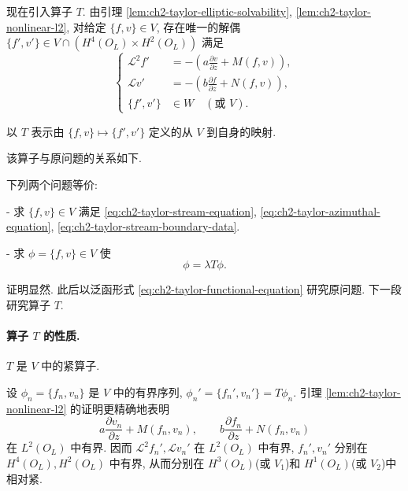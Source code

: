 现在引入算子 $T$. 由引理 \ref{lem:ch2-taylor-elliptic-solvability}, \ref{lem:ch2-taylor-nonlinear-l2}, 对给定 $\{f,v\}\in V$, 存在唯一的解偶 $\{f',v'\}\in V\cap(H^4(O_L)\times H^2(O_L))$ 满足
\begin{equation}
\left\{
\begin{aligned}
\mathcal L^2f'&=-\left(a\frac{\partial v}{\partial z}+M(f,v)\right),\\
\mathcal Lv'&=-\left(b\frac{\partial f}{\partial z}+N(f,v)\right),\\
\{f',v'\}&\in W\quad(\text{或 }V).
\end{aligned}
\right.
\label{eq:ch2-taylor-operator-definition-system}
\end{equation}

\begin{Definition}
\label{def:ch2-taylor-operator-t}
以 $T$ 表示由 $\{f,v\}\mapsto\{f',v'\}$ 定义的从 $V$ 到自身的映射.
\end{Definition}

该算子与原问题的关系如下.

\begin{Proposition}
\label{prop:ch2-taylor-functional-equivalence}
下列两个问题等价:

- 求 $\{f,v\}\in V$ 满足 \eqref{eq:ch2-taylor-stream-equation}, \eqref{eq:ch2-taylor-azimuthal-equation}, \eqref{eq:ch2-taylor-stream-boundary-data}.

- 求 $\phi=\{f,v\}\in V$ 使
\begin{equation}
\phi=\lambda T\phi.
\label{eq:ch2-taylor-functional-equation}
\end{equation}
\end{Proposition}

证明显然. 此后以泛函形式 \eqref{eq:ch2-taylor-functional-equation} 研究原问题. 下一段研究算子 $T$.

\hypertarget{chapter-02-page-171}{}
\paragraph{算子 $T$ 的性质.}
\label{subsec:ch2-taylor-operator-properties}

\begin{Lemma}
\label{lem:ch2-taylor-operator-compact}
$T$ 是 $V$ 中的紧算子.
\end{Lemma}

\begin{Proof}
设 $\phi_n=\{f_n,v_n\}$ 是 $V$ 中的有界序列, $\phi_n'=\{f_n',v_n'\}=T\phi_n$. 引理 \ref{lem:ch2-taylor-nonlinear-l2} 的证明更精确地表明
\[
a\frac{\partial v_n}{\partial z}+M(f_n,v_n),
\qquad
b\frac{\partial f_n}{\partial z}+N(f_n,v_n)
\]
在 $L^2(O_L)$ 中有界. 因而 $\mathcal L^2f_n',\mathcal Lv_n'$ 在 $L^2(O_L)$ 中有界, $f_n',v_n'$ 分别在 $H^4(O_L),H^2(O_L)$ 中有界, 从而分别在 $H^3(O_L)$(或 $V_1$)和 $H^1(O_L)$(或 $V_2$)中相对紧.
\end{Proof}

